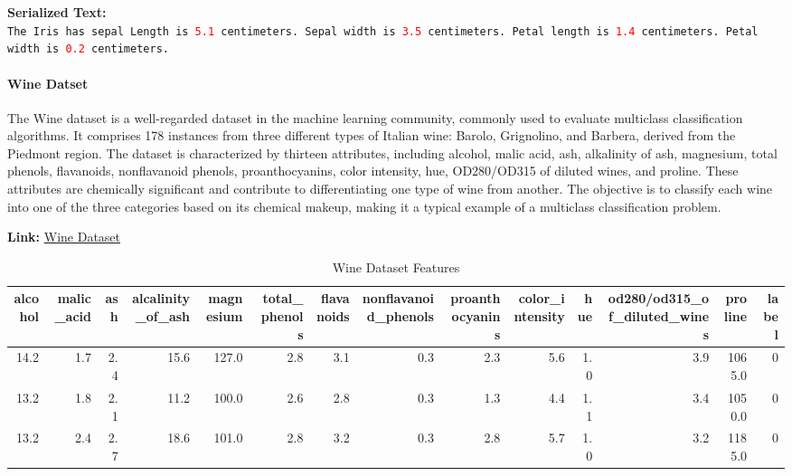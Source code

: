 \documentclass{article}
\theoremstyle{plain}
\theoremstyle{definition}
\theoremstyle{remark}
\begin{document}
\begin{mdframed}
\textbf{Serialized Text:}\\
\texttt{The Iris has sepal Length is \textcolor{red}{5.1} centimeters. Sepal width is \textcolor{red}{3.5} centimeters. Petal length is  \textcolor{red}{1.4}  centimeters. Petal width is  \textcolor{red}{0.2}  centimeters.}
\end{mdframed}

\paragraph{Wine Datset} The Wine \cite{misc_wine_109} dataset is a well-regarded dataset in the machine learning community, commonly used to evaluate multiclass classification algorithms. It comprises 178 instances from three different types of Italian wine: Barolo, Grignolino, and Barbera, derived from the Piedmont region. The dataset is characterized by thirteen attributes, including alcohol, malic acid, ash, alkalinity of ash, magnesium, total phenols, flavanoids, nonflavanoid phenols, proanthocyanins, color intensity, hue, OD280/OD315 of diluted wines, and proline. These attributes are chemically significant and contribute to differentiating one type of wine from another. The objective is to classify each wine into one of the three categories based on its chemical makeup, making it a typical example of a multiclass classification problem. 

\textbf{Link: }\href{https://archive.ics.uci.edu/dataset/109/wine}{Wine Dataset} 

\begin{table}[h!]
    \centering
    \caption{Wine Dataset Features}
\begin{adjustbox}{width=\textwidth}
\begin{tabular}{rrrrrrrrrrrrrr}
\toprule
 alcohol &  malic\_acid &  ash &  alcalinity\_of\_ash &  magnesium &  total\_phenols &  flavanoids &  nonflavanoid\_phenols &  proanthocyanins &  color\_intensity &  hue &  od280/od315\_of\_diluted\_wines &  proline &  label \\
\midrule
    14.2 &         1.7 &  2.4 &               15.6 &      127.0 &            2.8 &         3.1 &                   0.3 &              2.3 &              5.6 &  1.0 &                           3.9 &   1065.0 &      0 \\
    13.2 &         1.8 &  2.1 &               11.2 &      100.0 &            2.6 &         2.8 &                   0.3 &              1.3 &              4.4 &  1.1 &                           3.4 &   1050.0 &      0 \\
    13.2 &         2.4 &  2.7 &               18.6 &      101.0 &            2.8 &         3.2 &                   0.3 &              2.8 &              5.7 &  1.0 &                           3.2 &   1185.0 &      0 \\
\bottomrule
\end{tabular}
\end{adjustbox}
\end{table}
\end{document}
